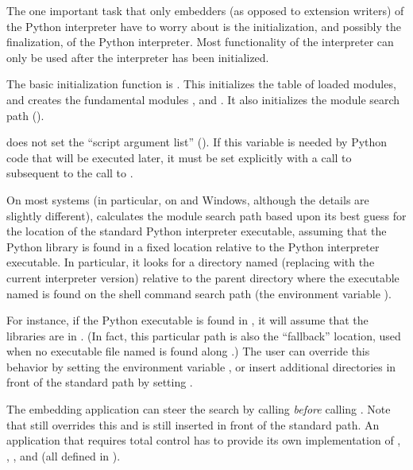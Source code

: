\documentclass{manual}
\begin{document}
The one important task that only embedders (as opposed to extension
writers) of the Python interpreter have to worry about is the
initialization, and possibly the finalization, of the Python
interpreter.  Most functionality of the interpreter can only be used
after the interpreter has been initialized.

The basic initialization function is
.
This initializes the table of loaded modules, and creates the
fundamental modules ,
 and 
.  It also initializes the module
search path ().%

 does not set the ``script argument list'' 
().  If this variable is needed by Python code that 
will be executed later, it must be set explicitly with a call to 
 subsequent to the call to
.

On most systems (in particular, on \UNIX{} and Windows, although the
details are slightly different),
 calculates the module search path based
upon its best guess for the location of the standard Python
interpreter executable, assuming that the Python library is found in a
fixed location relative to the Python interpreter executable.  In
particular, it looks for a directory named
 (replacing  with the current
interpreter version) relative to the parent directory where the
executable named  is found on the shell command search
path (the environment variable ).

For instance, if the Python executable is found in
, it will assume that the libraries are in
.  (In fact, this particular path
is also the ``fallback'' location, used when no executable file named
 is found along .)  The user can override
this behavior by setting the environment variable ,
or insert additional directories in front of the standard path by
setting .

The embedding application can steer the search by calling 
 \emph{before} calling 
.  Note that  still
overrides this and  is still inserted in front of
the standard path.  An application that requires total control has to
provide its own implementation of
,
,
, and
 (all
defined in ).
\end{document}

